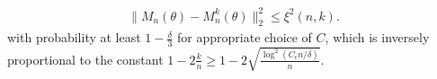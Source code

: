 \documentclass[twoside,11pt]{article}
\newlength{\widebarargwidth}
\newlength{\widebarargheight}
\newlength{\widebarargdepth}
\DeclareRobustCommand{\widebar}[1]{%
  \settowidth{\widebarargwidth}{\ensuremath{#1}}%
  \settoheight{\widebarargheight}{\ensuremath{#1}}%
  \settodepth{\widebarargdepth}{\ensuremath{#1}}%
  \addtolength{\widebarargwidth}{-0.3\widebarargheight}%
  \addtolength{\widebarargwidth}{-0.3\widebarargdepth}%
  \makebox[0pt][l]{\hspace{0.3\widebarargheight}%
    \hspace{0.3\widebarargdepth}%
    \addtolength{\widebarargheight}{0.3ex}%
    \rule[\widebarargheight]{0.95\widebarargwidth}{0.1ex}}%
  {#1}}
\newcommand{\numobs}{\ensuremath{n}}
\newcommand{\norm}[1]{\ensuremath{\|#1\|_2}}
\newcommand{\subsize}{\numobs} %
\newcommand{\subprob}{\delta}
\newcommand{\consteps}{C_\epsilon}
\newcommand{\nstates}{s}
\newcommand{\pistat}{\ensuremath{\widebar{\pi}}}
\newcommand{\stat}{\pistat}
\newcommand{\statmin}{\stat_{\min}}
\newcommand{\mixcoefeff}{\ensuremath{\widetilde{\rho}_{\mathrm{mix}}}}
\newcommand{\mixcoefeps}{\ensuremath{\epsilon_{\mathrm{mix}}}}
\newcommand{\emopsampn}[2]{M_{#1}(#2)}
\newcommand{\emopsamptruncn}[2]{M^k_{#1}(#2)}
\newcommand{\samperror}[1]{e_{#1}}
\newcommand{\kdim}{\ensuremath{k}}
\newcommand{\mustar}{\ensuremath{\mu^*}}
\begin{document}
\begin{align*}
   \|\emopsampn{\subsize}{\theta} -
 \emopsamptruncn{\subsize}{\theta}\|^2_2 \leq \xi^2(\numobs, \kdim).
\end{align*}
with probability at least $1-\frac{\delta}{3}$ for appropriate choice of  $C$, which is 
inversely proportional to the constant $1-2 \frac{\kdim}{\numobs} \geq
1 - 2\sqrt{\frac{ \log^2 (\consteps \numobs/\delta)}{\numobs}}$. \\
\end{document}

